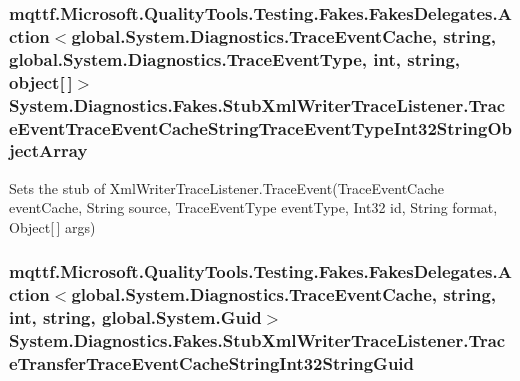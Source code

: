 \hypertarget{class_system_1_1_diagnostics_1_1_fakes_1_1_stub_xml_writer_trace_listener_a3cb58df65b5d7e17aa68bce55be08ada}{
\subsubsection[{Trace\-Event\-Trace\-Event\-Cache\-String\-Trace\-Event\-Type\-Int32\-String\-Object\-Array}]{\setlength{\rightskip}{0pt plus 5cm}mqttf.\-Microsoft.\-Quality\-Tools.\-Testing.\-Fakes.\-Fakes\-Delegates.\-Action$<$global.\-System.\-Diagnostics.\-Trace\-Event\-Cache, string, global.\-System.\-Diagnostics.\-Trace\-Event\-Type, int, string, object\mbox{[}$\,$\mbox{]}$>$ System.\-Diagnostics.\-Fakes.\-Stub\-Xml\-Writer\-Trace\-Listener.\-Trace\-Event\-Trace\-Event\-Cache\-String\-Trace\-Event\-Type\-Int32\-String\-Object\-Array}}\label{class_system_1_1_diagnostics_1_1_fakes_1_1_stub_xml_writer_trace_listener_a3cb58df65b5d7e17aa68bce55be08ada}


Sets the stub of Xml\-Writer\-Trace\-Listener.\-Trace\-Event(\-Trace\-Event\-Cache event\-Cache, String source, Trace\-Event\-Type event\-Type, Int32 id, String format, Object\mbox{[}$\,$\mbox{]} args)

\hypertarget{class_system_1_1_diagnostics_1_1_fakes_1_1_stub_xml_writer_trace_listener_a39ca26e34c53a5785e5322016288e5ba}{
\subsubsection[{Trace\-Transfer\-Trace\-Event\-Cache\-String\-Int32\-String\-Guid}]{\setlength{\rightskip}{0pt plus 5cm}mqttf.\-Microsoft.\-Quality\-Tools.\-Testing.\-Fakes.\-Fakes\-Delegates.\-Action$<$global.\-System.\-Diagnostics.\-Trace\-Event\-Cache, string, int, string, global.\-System.\-Guid$>$ System.\-Diagnostics.\-Fakes.\-Stub\-Xml\-Writer\-Trace\-Listener.\-Trace\-Transfer\-Trace\-Event\-Cache\-String\-Int32\-String\-Guid}}\label{class_system_1_1_diagnostics_1_1_fakes_1_1_stub_xml_writer_trace_listener_a39ca26e34c53a5785e5322016288e5ba}


